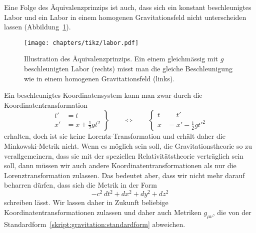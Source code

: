 Eine Folge des Äquivalenzprinzips ist auch, dass sich ein konstant
beschleunigtes Labor und ein Labor in einem homogenen Gravitationsfeld
nicht unterscheiden lassen (Abbildung~\ref{skript:gravitation:labor}).
\begin{figure}
\centering
\texttt{[image: chapters/tikz/labor.pdf]}
\caption{Illustration des Äquivalenzprinzips.
Ein einem gleichmässig mit $g$ beschleunigten Labor (rechts)
misst man die gleiche Beschleunigung wie in einem homogenen
Gravitationsfeld (links).
\label{skript:gravitation:labor}}
\end{figure}
Ein beschleunigtes Koordinatensystem kann man zwar durch die
Koordinatentransformation
\begin{equation}
\left.
\begin{aligned}
t'&=t\\
x'&=x+\frac12gt^2
\end{aligned}
\right\}
\qquad
\Leftrightarrow
\qquad
\left\{
\begin{aligned}
t&=t'\\
x&=x'-\frac12gt'^2
\end{aligned}
\right.
\label{skript:gravitation:beschleunigt}
\end{equation}
erhalten, doch ist sie keine Lorentz-Transformation und erhält daher
die Minkowski-Metrik nicht.
Wenn es möglich sein soll, die Gravitationstheorie so zu verallgemeinern,
dass sie mit der speziellen Relativitätstheorie verträglich sein soll, dann
müssen wir auch andere Koordinatentransformationen als nur die
Lorenztransformation zulassen.
Das bedeutet aber, dass wir nicht mehr darauf beharren dürfen, dass
sich die Metrik in der Form
\begin{equation}
-c^2\,dt^2 + dx^2 + dy^2  + dz^2
\label{skript:gravitation:standardform}
\end{equation}
schreiben lässt.
Wir lassen daher in Zukunft beliebige Koordinatentransformationen zulassen
und daher auch Metriken $g_{\mu\nu}$, die von der
Standardform~\eqref{skript:gravitation:standardform} abweichen.

